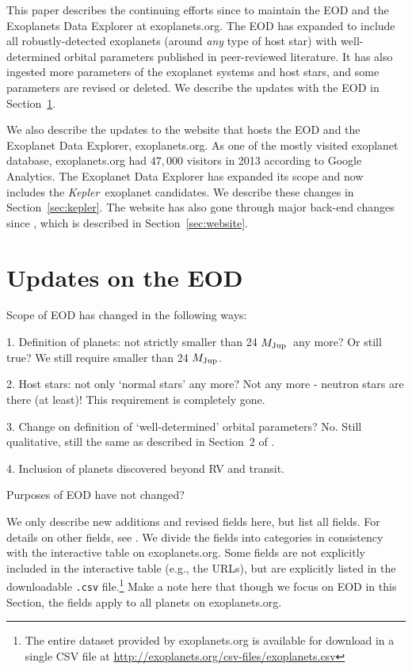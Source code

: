 \documentclass[11pt,preprint]{aastex}
\def\kepler{\textit{Kepler}}
\def\mjup{$M_{\rm Jup}$}
\begin{document}
\begin{CJK*}{UTF8}{gbsn}
This paper describes the continuing efforts since \cite{Wright2011} to
maintain the EOD and the Exoplanets Data Explorer at
exoplanets.org. The EOD has expanded to include all robustly-detected
exoplanets (around {\it any} type of host star) with well-determined
orbital parameters published in peer-reviewed literature. It has also
ingested more parameters of the exoplanet systems and host stars, and
some parameters are revised or deleted. We describe the updates with
the EOD in Section~\ref{sec:update}.

We also describe the updates to the website that hosts the EOD and the
Exoplanet Data Explorer, exoplanets.org. As one of the mostly visited
exoplanet database, exoplanets.org had $47,000$ visitors in 2013
according to Google Analytics. The Exoplanet Data Explorer has
expanded its scope and now includes the \kepler\ exoplanet
candidates. We describe these changes in Section~\ref{sec:kepler}. The
website has also gone through major back-end changes since
\cite{Wright2011}, which is described in Section~\ref{sec:website}.



\section{Updates on the EOD}\label{sec:update}

Scope of EOD has changed in the following ways:

1. Definition of planets: not strictly smaller than 24 \mjup\ any
more? Or still true? We still require smaller than 24 \mjup.

2. Host stars: not only `normal stars' any more? Not any more -
neutron stars are there (at least)! This requirement is completely gone.

3. Change on definition of `well-determined' orbital parameters? No. Still
qualitative, still the same as described in Section~2 of \cite{Wright2011}.

4. Inclusion of planets discovered beyond RV and transit.

Purposes of EOD have not changed?

We only describe new additions and revised fields here, but list all
fields. For details on other fields, see \cite{Wright2011}. We divide
the fields into categories in consistency with the interactive table
on exoplanets.org. Some fields are not explicitly included in the
interactive table (e.g., the URLs), but are explicitly listed in the
downloadable {\tt .csv} file.\footnote{The entire dataset provided by
  exoplanets.org is available for download in a single CSV file at
  \url{http://exoplanets.org/csv-files/exoplanets.csv}} Make a note
here that though we focus on EOD in this Section, the fields apply to
all planets on exoplanets.org.


\end{CJK*}
\end{document}
